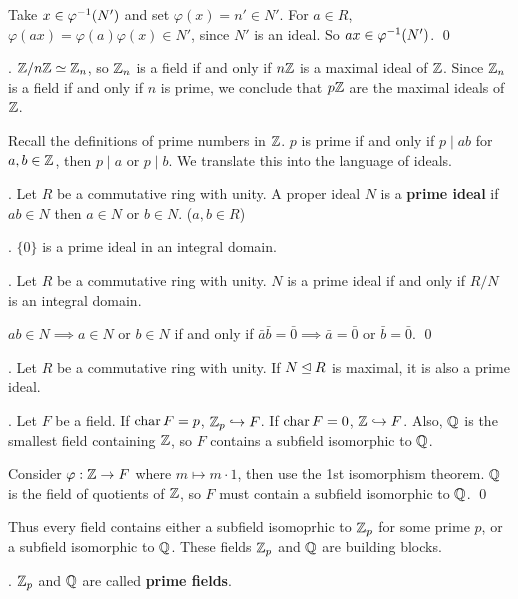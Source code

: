 \pf {} Take \(x \in \varphi^{-1}(N')\) and set \(\varphi(x) = n' \in N'\). For \(a \in R\), \(\varphi(ax) = \varphi(a)\varphi(x) \in N'\), since \(N'\) is an ideal. So \(ax \in \varphi^{-1}(N')\). \qed

\ex. \(\mathbb{Z}/n\mathbb{Z} \simeq \mathbb{Z}_n\), so \(\mathbb{Z}_n\) is a field if and only if \(n\mathbb{Z}\) is a maximal ideal of \(\mathbb{Z}\). Since \(\mathbb{Z}_n\) is a field if and only if \(n\) is prime, we conclude that \(p\mathbb{Z}\) are the maximal ideals of \(\mathbb{Z}\).

Recall the definitions of prime numbers in \(\mathbb{Z}\). \(p\) is prime if and only if \(p \mid ab\) for \(a, b \in \mathbb{Z}\), then \(p \mid a\) or \(p \mid b\). We translate this into the language of ideals.

.  Let \(R\) be a commutative ring with unity. A proper ideal \(N\) is a \textbf{prime ideal} if \(ab \in N\) then \(a \in N\) or \(b \in N\). (\(a, b \in R\))

\ex. \(\{0\}\) is a prime ideal in an integral domain.

\thm. Let \(R\) be a commutative ring with unity. \(N\) is a prime ideal if and only if \(R/N\) is an integral domain.

\pf \(ab \in N \implies a \in N\) or \(b \in N\) if and only if \(\bar{a}\bar{b} = \bar{0} \implies \bar{a} = \bar{0}\) or \(\bar{b} = \bar{0}\). \qed

\cor. Let \(R\) be a commutative ring with unity. If \(N \unlhd R\) is maximal, it is also a prime ideal.

\thm. Let \(F\) be a field. If \(\operatorname{char} F = p\), \(\mathbb{Z}_p \hookrightarrow F\). If \(\operatorname{char} F = 0\), \(\mathbb{Z} \hookrightarrow F\). Also, \(\mathbb{Q}\) is the smallest field containing \(\mathbb{Z}\), so \(F\) contains a subfield isomorphic to \(\mathbb{Q}\).

\begin{center}
\end{center}

\pf Consider \(\varphi: \mathbb{Z} \rightarrow F\) where \(m \mapsto m \cdot 1\), then use the 1st isomorphism theorem. \(\mathbb{Q}\) is the field of quotients of \(\mathbb{Z}\), so \(F\) must contain a subfield isomorphic to \(\mathbb{Q}\). \qed

Thus every field contains either a subfield isomoprhic to \(\mathbb{Z}_p\) for some prime \(p\), or a subfield isomorphic to \(\mathbb{Q}\). These fields \(\mathbb{Z}_p\) and \(\mathbb{Q}\) are building blocks.

. \(\mathbb{Z}_p\) and \(\mathbb{Q}\) are called \textbf{prime fields}.

\pagebreak
